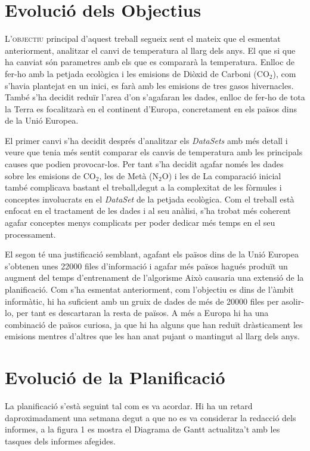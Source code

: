 \documentclass[10pt,a4paper,twocolumn,twoside]{article}
\begin{document}
\section{Evolució dels Objectius}
\lettrine[lines=3]{L}{'objectiu} principal d'aquest treball segueix sent el mateix que el esmentat anteriorment, analitzar el canvi de temperatura al llarg dels anys. El que si que ha canviat són parametres amb els que es compararà la temperatura. Enlloc de fer-ho amb la petjada ecològica i les emisions de Diòxid de Carboni (CO$_2$), com s'havia plantejat en un inici, es farà amb les emisions de tres gasos hivernacles. També s'ha decidit reduïr l'area d'on s'agafaran les dades, enlloc de fer-ho de tota la Terra es focalitzarà en el continent d'Europa, concretament en els països dins de la Unió Europea.

El primer canvi s'ha decidit després d'analitzar els \textit{DataSets} amb més detall i veure que tenia més sentit comparar els canvis de temperatura amb les principals causes que podien provocar-los. Per tant s'ha decidit agafar només les dades sobre les emisions de  CO$_2$, les de Metà (N$_2$O) i les de  La comparació inicial també complicava bastant el treball,degut a la complexitat de les fòrmules i conceptes involucrats en el \textit{DataSet} de  la petjada ecològica. Com el treball està enfocat en el tractament de les dades i al seu anàlisi, s'ha trobat més coherent agafar conceptes menys complicats per  poder dedicar més temps en el seu processament. 

El segon té una justificació semblant, agafant els països dins de la Unió Europea s'obtenen unes 22000 files d'informació i agafar més països hagués produït un augment del temps d'entrenament de l'algorisme Això causaria una extensió de la planificació. Com s'ha esmentat anteriorment, com l'objectiu es dins de l'àmbit informàtic, hi ha suficient amb un gruix de dades de més de 20000 files per asolir-lo, per tant es descartaran la resta de països. A més a Europa hi ha una combinació de països curiosa, ja que hi ha alguns que han reduït dràsticament les emisions mentres d'altres que les han anat pujant o mantingut al llarg dels anys. 

\section{ Evolució de la Planificació}
La planificació s'està seguint tal com es va acordar. Hi ha un retard daproximadament una setmana degut a que no es va considerar la redacció dels informes, a la figura 1 es mostra el Diagrama de Gantt actualitza't amb les tasques dels informes afegides. 
\end{document}
